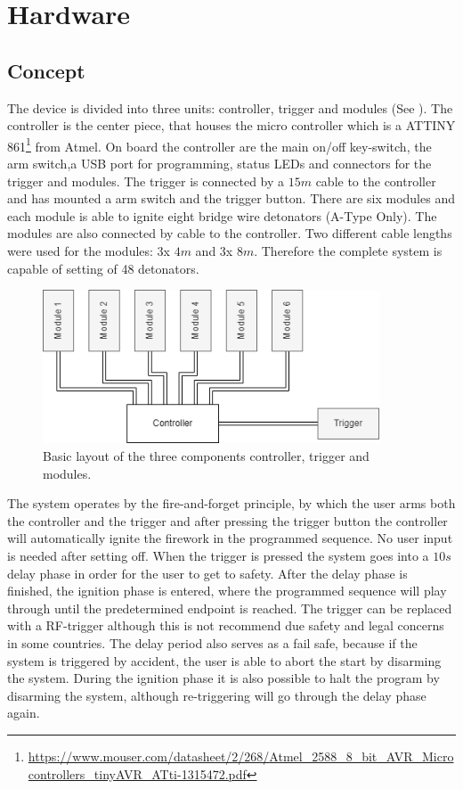 \pagebreak

\section{Hardware}
\label{Hardware}

\subsection{Concept}
\label{Concept}
The device is divided into three units: controller, trigger and modules (See ). The controller is the center piece, that houses the micro controller which is a ATTINY 861\footnote{\url{https://www.mouser.com/datasheet/2/268/Atmel_2588_8_bit_AVR_Microcontrollers_tinyAVR_ATti-1315472.pdf}} from Atmel. On board the controller are the main on/off key-switch, the arm switch,a USB port for programming, status LEDs and connectors for the trigger and modules. The trigger is connected by a $15m$ cable to the controller and has mounted a arm switch and the trigger button. There are six modules and each module is able to ignite eight bridge wire detonators (A-Type Only). The modules are also connected by cable to the controller. Two different cable lengths were used for the modules: 3x $4m$ and 3x $8m$. Therefore the complete system is capable of setting of 48 detonators.

\begin{figure}[!ht]
    \centering
    \includegraphics[width=10cm]{./Figures/concept.png}
    \caption{Basic layout of the three components controller, trigger and modules.}
    \label{fig:concept}     
\end{figure}

\noindent The system operates by the fire-and-forget principle, by which the user arms both the controller and the trigger and after pressing the trigger button the controller will automatically ignite the firework in the programmed sequence. No user input is needed after setting off. When the trigger is pressed the system goes into a $10s$ delay phase in order for the user to get to safety. After the delay phase is finished, the ignition phase is entered, where the programmed sequence will play through until the predetermined endpoint is reached. The trigger can be replaced with a RF-trigger although this is not recommend due safety and legal concerns in some countries. The delay period also serves as a fail safe, because if the system is triggered by accident, the user is able to abort the start by disarming the system. During the ignition phase it is also possible to halt the program by disarming the system, although re-triggering will go through the delay phase again.\\

